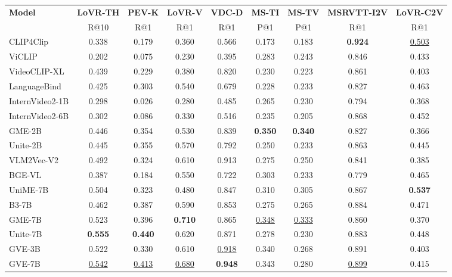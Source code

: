 \begin{table}[t]
\begin{tabularx}{\linewidth}{X|*{8}{c}}
\toprule
\textbf{Model} & \textbf{LoVR-TH} & \textbf{PEV-K} & \textbf{LoVR-V} & \textbf{VDC-D} & \textbf{MS-TI} & \textbf{MS-TV} & \textbf{MSRVTT-I2V} & \textbf{LoVR-C2V} \\
& R@10 & R@1 & R@1 & R@1 & P@1 & P@1 & R@1 & R@1 \\
\midrule
CLIP4Clip & 0.338 & 0.179 & 0.360 & 0.566 & 0.173 & 0.183 & \textbf{0.924} & \underline{0.503} \\
ViCLIP & 0.202 & 0.075 & 0.230 & 0.395 & 0.283 & 0.243 & 0.846 & 0.433 \\
VideoCLIP-XL & 0.439 & 0.229 & 0.380 & 0.820 & 0.230 & 0.223 & 0.861 & 0.403 \\
LanguageBind & 0.425 & 0.303 & 0.540 & 0.679 & 0.228 & 0.233 & 0.827 & 0.463 \\
InternVideo2-1B & 0.298 & 0.026 & 0.280 & 0.485 & 0.265 & 0.230 & 0.794 & 0.368 \\
InternVideo2-6B & 0.302 & 0.086 & 0.330 & 0.516 & 0.235 & 0.205 & 0.868 & 0.452 \\
GME-2B & 0.446 & 0.354 & 0.530 & 0.839 & \textbf{0.350} & \textbf{0.340} & 0.827 & 0.366 \\
Unite-2B & 0.445 & 0.355 & 0.570 & 0.792 & 0.250 & 0.233 & 0.863 & 0.445 \\
VLM2Vec-V2 & 0.492 & 0.324 & 0.610 & 0.913 & 0.275 & 0.250 & 0.841 & 0.385 \\
BGE-VL & 0.387 & 0.184 & 0.550 & 0.722 & 0.303 & 0.233 & 0.779 & 0.465 \\
UniME-7B & 0.504 & 0.323 & 0.480 & 0.847 & 0.310 & 0.305 & 0.867 & \textbf{0.537} \\
B3-7B & 0.462 & 0.387 & 0.590 & 0.853 & 0.275 & 0.265 & 0.884 & 0.471 \\
GME-7B & 0.523 & 0.396 & \textbf{0.710} & 0.865 & \underline{0.348} & \underline{0.333} & 0.860 & 0.370 \\
Unite-7B & \textbf{0.555} & \textbf{0.440} & 0.620 & 0.871 & 0.278 & 0.230 & 0.883 & 0.448 \\
\midrule
GVE-3B & 0.522 & 0.330 & 0.610 & \underline{0.918} & 0.340 & 0.268 & 0.891 & 0.403 \\
GVE-7B & \underline{0.542} & \underline{0.413} & \underline{0.680} & \textbf{0.948} & 0.343 & 0.280 & \underline{0.899} & 0.415 \\
\bottomrule
\end{tabularx}
\end{table}

